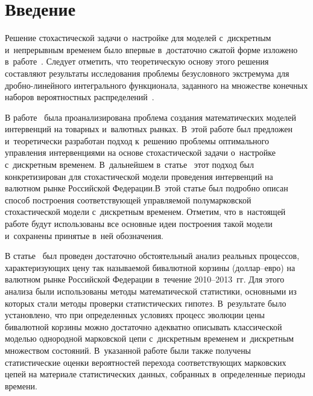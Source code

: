 
  



\thispagestyle{headings}

\begin{multicols}{2}

\label{st\stat}


\section{Введение}

Решение стохастической задачи о~настройке для моделей с~дискретным и~непрерывным 
временем было впервые в~достаточно сжатой форме изложено в~работе~\cite{A1}.
Следует отметить, что теоретическую основу этого решения составляют результаты 
исследования проблемы безусловного экстремума для дроб\-но-ли\-ней\-но\-го интегрального 
функционала, заданного на множестве конечных наборов вероятностных распределений~\cite{A2, A3}.

В работе~\cite{A4} была проанализирована проблема создания математических 
моделей интервенций на товарных и~валютных рынках. В~этой работе был предложен 
и~теоретически разработан подход к~решению проб\-ле\-мы оптимального управ\-ле\-ния 
интервенциями на основе стохастической задачи о~настройке с~дискретным временем. 
В~дальнейшем в~статье~\cite{A5} этот подход был конкретизирован для 
стохастической модели проведения интервенций на валютном рынке Российской 
Федерации.\linebreak В~этой статье был под\-роб\-но описан способ построения соответствующей 
управляемой полумарковской стохастической модели с~дискретным временем. Отметим, 
что в~на\-сто\-ящей работе будут \mbox{использованы} все основные идеи по\-стро\-ения такой 
модели и~сохранены принятые в~ней обозна\-че\-ния.
{

}

В статье~\cite{A6} был проведен достаточно обстоятельный анализ реальных 
процессов, характеризующих цену так называемой бивалютной корзины (дол\-лар--ев\-ро) 
на валютном рынке Российской Федерации в~течение 2010--2013~гг. Для этого 
анализа были использованы методы математической статистики, основными из которых 
стали методы проверки статистических гипотез. В~результате было установлено, что 
при определенных условиях процесс эволюции цены бивалютной корзины можно 
достаточно адекватно описывать классической моделью однородной марковской цепи 
с~дискретным временем и~дискретным множеством состояний. В~указанной работе были 
также получены статистические оценки вероятностей перехода со\-от\-вет\-ст\-ву\-ющих 
марковских цепей на материале статистических данных, собранных в~определенные 
периоды времени.


\end{multicols}
